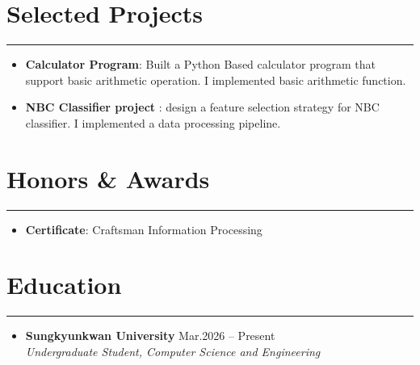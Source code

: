 \documentclass[letterpaper, 10pt]{article}
\begin{document}
\section*{Selected Projects} 
\hrule 
\vspace{4pt} 
\begin{itemize} 
\item \textbf {Calculator Program}: Built a Python Based calculator program that support basic arithmetic operation. I implemented basic arithmetic function.
\item \textbf {NBC Classifier project} : design a feature selection strategy for NBC classifier. I implemented a data processing pipeline.
\end{itemize}
 
\section*{Honors \& Awards} 
\hrule 
\vspace{4pt} 
\begin{itemize} 
\item \textbf {Certificate}: Craftsman Information Processing
\end{itemize}

\section*{Education} 
\hrule 
\vspace{4pt} 
\begin{itemize} 
\item[] \textbf {Sungkyunkwan University} 
\hfill Mar.2026 -- Present \\
\textit {Undergraduate Student, Computer Science and Engineering}
\end{itemize}
 
\end{document}
